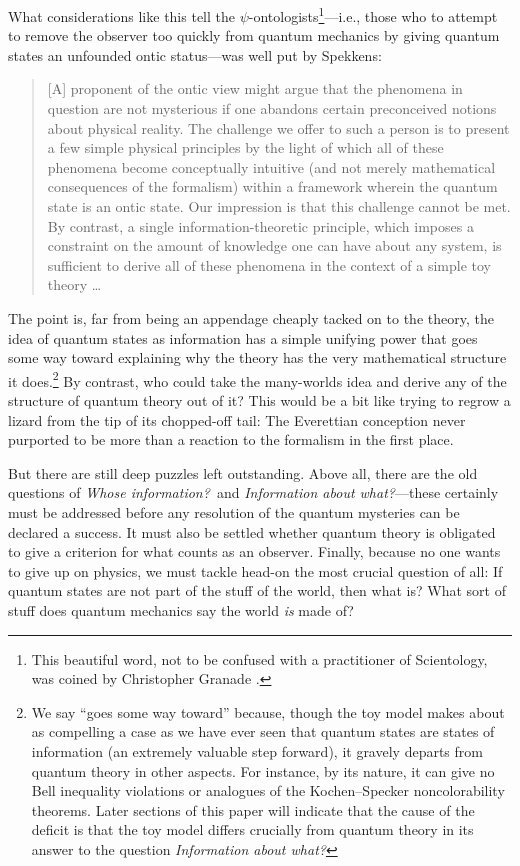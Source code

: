 \documentclass[aps,pra,superscriptaddress,10pt,tightenlines,twocolumn,nofootinbib]{revtex4}
\begin{document}
What considerations like this tell the $\psi$-ontologists\footnote{This beautiful word, not to be confused with a practitioner of Scientology, was coined by Christopher Granade \cite{LordVoldemort}.}---i.e., those who to attempt to remove the observer too quickly from quantum mechanics by giving quantum states an unfounded ontic status---was well put by Spekkens:
\begin{quote}
[A] proponent of the ontic view might argue that the phenomena in question are not mysterious if one abandons certain preconceived notions about physical reality.  The challenge we offer to such a person is to present a few simple physical principles by the light of which all of these phenomena become conceptually intuitive (and not merely mathematical consequences of the formalism) within a framework wherein the quantum state is an ontic state. Our impression is that this challenge cannot be met.  By contrast, a single information-theoretic principle, which imposes a constraint on the amount of knowledge one can have about any system, is sufficient to derive all of these phenomena in the context of a simple toy theory \ldots
\end{quote}
The point is, far from being an appendage cheaply tacked on to the theory, the idea of quantum states as information has a simple unifying power that goes some way toward explaining why the theory has the very mathematical structure it does.\footnote{We say ``goes some way toward'' because, though the toy model makes about as compelling a case as we have ever seen that quantum states are states of information (an extremely valuable step forward), it gravely departs from quantum theory in other aspects. For instance, by its nature, it can give no Bell inequality violations or analogues of the Kochen--Specker noncolorability theorems.  Later sections of this paper will indicate that the cause of the deficit is that the toy model differs crucially from quantum theory in its answer to the question {\it Information about what?}}  By contrast, who could take the many-worlds idea and derive any of the structure of quantum theory out of it?  This would be a bit like trying to regrow a lizard from the tip of its chopped-off tail:  The Everettian conception never purported to be more than a reaction to the formalism in the first place.

But there are still deep puzzles left outstanding.  Above all, there are the old questions of {\it Whose information?}\ and {\it Information about what?}---these certainly must be addressed before any resolution of the quantum mysteries can be declared a success.  It must also be settled whether quantum theory is obligated to give a criterion for what counts as an observer.  Finally, because no one wants to give up on physics, we must tackle head-on the most crucial question of all:  If quantum states are not part of the stuff of the world, then what is?  What sort of stuff does quantum mechanics say the world {\it is\/} made of?
\end{document}

